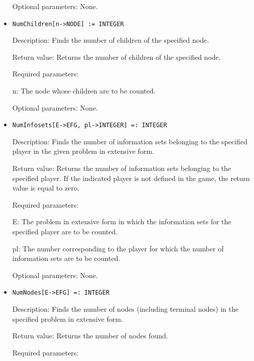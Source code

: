 \begin{itemize}
\item 
[Optional parameters:] None.
\ed

\item
\protect \large \begin{verbatim}
NumChildren[n->NODE] := INTEGER
\end{verbatim}\normalsize

\bd
\item
[Description:] Finds the number of children of the specified node.
\item
[Return value:] Returns the number of children of the specified node.
\item
[Required parameters:]\hfil\null

\bd
\item
[n:] The node whose children are to be counted.
\ed

\item
[Optional parameters:] None.
\ed

\item
\protect \large \begin{verbatim}
NumInfosets[E->EFG, pl->INTEGER] =: INTEGER
\end{verbatim}\normalsize

\bd
\item
[Description:] Finds the number of information sets belonging to the
specified player in the given problem in extensive form.
\item
[Return value:] Returns the number of information sets belonging to
the specified player.  If the indicated player is not defined in the
game, the return value is equal to zero.
\item
[Required parameters:]\hfil\null

\bd
\item
[E:] The problem in extensive form in which the information sets for
the specified player are to be counted.
\item
[pl:] The number corresponding to the player for which the number of
information sets are to be counted.
\ed
\item
 [Optional parameters:] None.
\ed

\item
\protect \large \begin{verbatim}
NumNodes[E->EFG] =: INTEGER
\end{verbatim}\normalsize

\bd
\item
[Description:] Finds the number of nodes (including terminal nodes) in
the specified problem in extensive form.
\item
[Return value:] Returns the number of nodes found.
\item
[Required parameters:]\hfil\null


\end{itemize}
